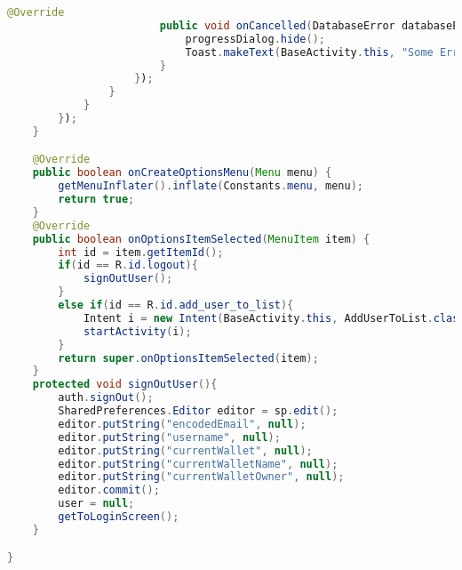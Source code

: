 \documentclass{article}
\begin{document}
\begin{lstlisting}[language=Java]
                        @Override
                        public void onCancelled(DatabaseError databaseError) {
                            progressDialog.hide();
                            Toast.makeText(BaseActivity.this, "Some Error Occured",Toast.LENGTH_SHORT).show();
                        }
                    });
                }
            }
        });
    }

    @Override
    public boolean onCreateOptionsMenu(Menu menu) {
        getMenuInflater().inflate(Constants.menu, menu);
        return true;
    }
    @Override
    public boolean onOptionsItemSelected(MenuItem item) {
        int id = item.getItemId();
        if(id == R.id.logout){
            signOutUser();
        }
        else if(id == R.id.add_user_to_list){
            Intent i = new Intent(BaseActivity.this, AddUserToList.class);
            startActivity(i);
        }
        return super.onOptionsItemSelected(item);
    }
    protected void signOutUser(){
        auth.signOut();
        SharedPreferences.Editor editor = sp.edit();
        editor.putString("encodedEmail", null);
        editor.putString("username", null);
        editor.putString("currentWallet", null);
        editor.putString("currentWalletName", null);
        editor.putString("currentWalletOwner", null);
        editor.commit();
        user = null;
        getToLoginScreen();
    }

}

\end{lstlisting}
\end{document}
